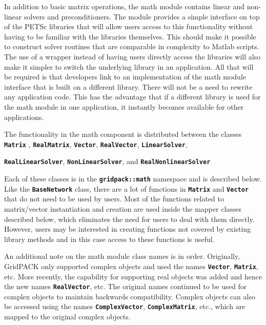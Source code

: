 \documentclass[12pt]{report} %
\begin{document}
In addition to basic matrix operations, the math module contains linear and non-linear solvers and preconditioners. The module provides a simple interface on top of the PETSc libraries that will allow users access to this functionality without having to be familiar with the libraries themselves. This should make it possible to construct solver routines that are comparable in complexity to Matlab scripts. The use of a wrapper instead of having users directly access the libraries will also make it simpler to switch the underlying library in an application. All that will be required is that developers link to an implementation of the math module interface that is built on a different library. There will not be a need to rewrite any application code. This has the advantage that if a different library is used for the math module in one application, it instantly becomes available for other applications.

The functionality in the math component is distributed between the classes \texttt{\textbf{Matrix}} , \texttt{\textbf{RealMatrix}}, \texttt{\textbf{Vector}}, \texttt{\textbf{RealVector}}, \texttt{\textbf{LinearSolver}}, 

\texttt{\textbf{RealLinearSolver}}, \texttt{\textbf{NonLinearSolver}}, and \texttt{\textbf{RealNonlinearSolver}}


Each of these classes is in the \texttt{\textbf{gridpack::math}} namespace and is described below. Like the \texttt{\textbf{BaseNetwork}} class, there are a lot of functions in \texttt{\textbf{Matrix}} and \texttt{\textbf{Vector}} that do not need to be used by users. Most of the functions related to matrix/vector instantiation and creation are used inside the mapper classes described below, which eliminates the need for users to deal with them directly. However, users may be interested in creating functions not covered by existing library methods and in this case access to these functions is useful.

An additional note on the math module class names is in order. Originally, GridPACK only supported complex objects and used the names \texttt{\textbf{Vector}}, \texttt{\textbf{Matrix}}, etc. More recently, the capability for supporting real objects was added and hence the new names \texttt{\textbf{RealVector}}, etc. The original names continued to be used for complex objects to maintain backwards compatibility. Complex objects can also be accessed using the names \texttt{\textbf{ComplexVector}}, \texttt{\textbf{ComplexMatrix}}, etc., which are mapped to the original complex objects.
\end{document}
